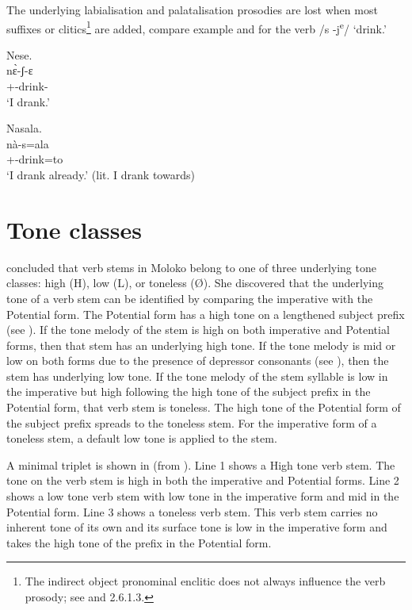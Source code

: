 The underlying labialisation and palatalisation prosodies are lost when most suffixes or clitics\footnote{The indirect object pronominal enclitic does not always influence the verb prosody; see  and 2.6.1.3.} are added, compare example  and  for the verb /s -j\textsuperscript{e}/ ‘drink.’  

\ea \label{ex:6:17}
Nese.\\
\gll  n\`ɛ-ʃ{}-ɛ\\
      {\oneS}+{\PFV}-drink-{\CL}\\
\glt  ‘I drank.’
\z

\ea \label{ex:6:18}
Nasala.\\
\gll  nà-s=ala\\
      {\oneS}+{\PFV}-drink=to\\
\glt  ‘I drank already.’ (lit. I drank towards)
\z
{}
\section{Tone classes}\label{sec:6.7}
\hypertarget{RefHeading1212021525720847}{}
\citet{Bow1997c} concluded that verb stems in Moloko belong to one of three underlying tone classes: high (H), low (L), or toneless (Ø). She discovered that the underlying tone of a verb stem can be identified by comparing the {\twoS} imperative with the Potential form. The Potential form has a high tone on a lengthened subject prefix (see ). If the tone melody of the stem is high on both imperative and Potential forms, then that stem has an underlying high tone. If the tone melody is mid or low on both forms due to the presence of depressor consonants (see ), then the stem has underlying low tone.  If the tone melody of the stem syllable is low in the imperative but high following the high tone of the subject prefix in the Potential form, that verb stem is toneless. The high tone of the Potential form of the subject prefix spreads to the toneless stem. For the imperative form of a toneless stem, a default low tone is applied to the stem.  

A minimal triplet is shown in  (from \citealt{FriesenMamalis2008}). Line 1 shows a High tone verb stem. The tone on the verb stem is high in both the imperative and Potential forms. Line 2 shows a low tone verb stem with low tone in the imperative form and mid in the Potential form. Line 3 shows a toneless verb stem. This verb stem carries no inherent tone of its own and its surface tone is low in the imperative form and takes the high tone of the prefix in the Potential form. 

